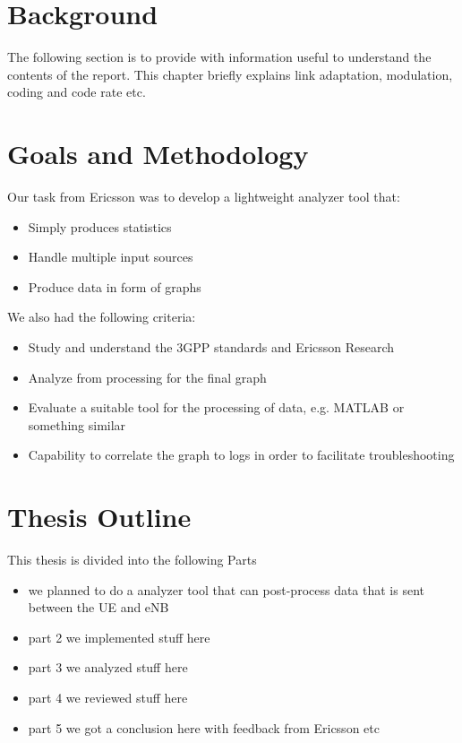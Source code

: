 \documentclass[cropmarks, frame, english]{idamasterthesis}
\begin{document}
\section{Background}
The following section is to provide with information useful to understand the contents of the report. This chapter briefly explains link adaptation, modulation, coding and code rate etc.

\section{Goals and Methodology}

Our task from Ericsson was to develop a lightweight analyzer tool that:
 \begin{itemize} 
 \item Simply produces statistics
 \item Handle multiple input sources
 \item Produce data in form of graphs
 \end{itemize} 

\setlength{\parindent}{0cm} We also had the following criteria: 
 \begin{itemize} 
 \item Study and understand the 3GPP standards and Ericsson Research
 \item Analyze from processing for the final graph
 \item Evaluate a suitable tool for the processing of data, e.g. MATLAB or something similar
 \item Capability to correlate the graph to logs in order to facilitate troubleshooting
 \end{itemize}


\section{Thesis Outline}
This thesis is divided into the following Parts
\begin{itemize}
	\item we planned to do a analyzer tool that can post-process data that is sent between the UE and eNB
	\item part 2 we implemented stuff here
	\item part 3 we analyzed  stuff here
	\item part 4 we reviewed stuff here
	\item part 5 we got a conclusion here with feedback from Ericsson etc
\end{itemize}
\end{document}
